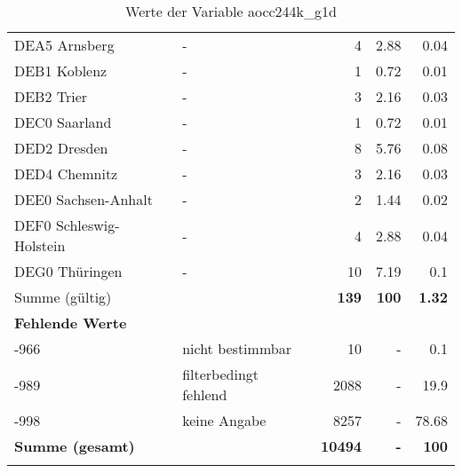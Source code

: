 \begin{longtable}{Xlrrr}
        \multicolumn{1}{X}{DEA5 Arnsberg} & - & \num{4} & \num[round-mode=places,round-precision=2]{2.88} & \num[round-mode=places,round-precision=2]{0.04} \\
        \multicolumn{1}{X}{DEB1 Koblenz} & - & \num{1} & \num[round-mode=places,round-precision=2]{0.72} & \num[round-mode=places,round-precision=2]{0.01} \\
        \multicolumn{1}{X}{DEB2 Trier} & - & \num{3} & \num[round-mode=places,round-precision=2]{2.16} & \num[round-mode=places,round-precision=2]{0.03} \\
        \multicolumn{1}{X}{DEC0 Saarland} & - & \num{1} & \num[round-mode=places,round-precision=2]{0.72} & \num[round-mode=places,round-precision=2]{0.01} \\
        \multicolumn{1}{X}{DED2 Dresden} & - & \num{8} & \num[round-mode=places,round-precision=2]{5.76} & \num[round-mode=places,round-precision=2]{0.08} \\
        \multicolumn{1}{X}{DED4 Chemnitz} & - & \num{3} & \num[round-mode=places,round-precision=2]{2.16} & \num[round-mode=places,round-precision=2]{0.03} \\
        \multicolumn{1}{X}{DEE0 Sachsen-Anhalt} & - & \num{2} & \num[round-mode=places,round-precision=2]{1.44} & \num[round-mode=places,round-precision=2]{0.02} \\
        \multicolumn{1}{X}{DEF0 Schleswig-Holstein} & - & \num{4} & \num[round-mode=places,round-precision=2]{2.88} & \num[round-mode=places,round-precision=2]{0.04} \\
        \multicolumn{1}{X}{DEG0 Thüringen} & - & \num{10} & \num[round-mode=places,round-precision=2]{7.19} & \num[round-mode=places,round-precision=2]{0.1} \\
     \midrule
      \multicolumn{2}{l}{Summe (gültig)} & \textbf{\num{139}} &
      \textbf{\num{100}} &
         \textbf{\num[round-mode=places,round-precision=2]{1.32}} \\
     \multicolumn{5}{l}{\textbf{Fehlende Werte}}\\
       -966 & nicht bestimmbar & \num{10} & - & \num[round-mode=places,round-precision=2]{0.1} \\

       -989 & filterbedingt fehlend & \num{2088} & - & \num[round-mode=places,round-precision=2]{19.9} \\

       -998 & keine Angabe & \num{8257} & - & \num[round-mode=places,round-precision=2]{78.68} \\

     \midrule
     \multicolumn{2}{l}{\textbf{Summe (gesamt)}} & \textbf{\num{10494}} & \textbf{-} & \textbf{\num{100}} \\
     \bottomrule
     \caption{Werte der Variable aocc244k\_g1d}
     \end{longtable}
     
